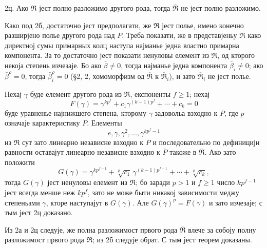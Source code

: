 \documentclass[11pt]{article}
\begin{document}
\setcounter{footnote}{22}

2ц. Ако $\mathfrak R$ јест полно разложимо другого рода, тогда $\overline{\mathfrak R}$ не јест полно разложимо.

Како под 2б, достаточно јест предполагати, же $\mathfrak R$ јест полье, имено конечно разширјено полье другого рода над $P$. Треба показати, же в представјеньу $\overline{\mathfrak R}$ како директној сумы примарных колц наступа најманье једна властно примарна компонента. За то достаточно јест показати ненуловы елемент из $\overline{\mathfrak R}$, од кторого некоја степень изчезаје. Бо ако $\bar\beta\ne0$, тогда најманье једна компонента $\bar\beta_i\ne0$; ако $\bar\beta^\rho=0$, тогда $\bar\beta_i^\rho=0$ (\S 2, 2, хомоморфизм од $\overline{\mathfrak R}$ к $\overline{\mathfrak R}_i$), и зато $\overline{\mathfrak R}_i$ не јест полье.

Нехај $\gamma$ буде елемент другого рода из $\mathfrak R$, експоненты $f\ge 1$; нехај
\[
        F(\gamma)=\gamma^{kp^f}+c_1\gamma^{(k-1)p^f}+\cdots+c_k=0
\]
буде уравненье најнижшего степена, кторому $\gamma$ задовольа взходно к $P$, где $p$ означаје карактеристику $P$. Елементы
\[
        e,\gamma,\gamma^2,\ldots,\gamma^{kp^f-1}
\]
из $\mathfrak R$ сут зато линеарно независне взходно к $P$ и последовательно по дефиницији равности оставајут линеарно независне взходно к $\overline P$ такоже в $\overline{\mathfrak R}$. Ако зато положити
\[
        G(\gamma)=\gamma^{kp^{f-1}}+\sqrt[p]{c_1}\,\gamma^{(k-1)p^{f-1}}
        +\cdots+\sqrt[p]{c_k},
\]
тогда $G(\gamma)$ јест ненуловы елемент из $\overline{\mathfrak R}$; бо заради $p>1$ и $f\ge1$ число $kp^{f-1}$ јест всегда менше неж $kp^f$, зато не може быти никакој зависимости меджу степеньами $\gamma$, кторе наступајут в $G(\gamma)$. Але $G(\gamma)^p=F(\gamma)$ и зато изчезаје; с тым јест 2ц доказано.

Из 2а и 2ц следује, же полна разложимост првого рода $\overline{\mathfrak R}$ влече за собоју полну разложимост првого рода $\mathfrak R$; из 2б следује обрат. С тым јест теорем доказаны.
\end{document}
